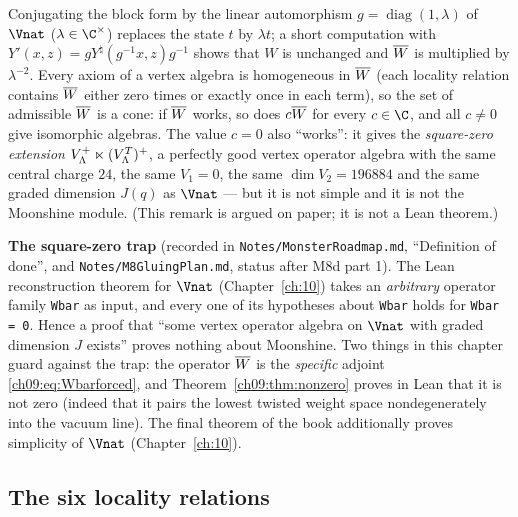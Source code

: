 \begin{remark}[Scaling, and why $\chnineWb=0$ is dangerous]\label{ch09:rem:scaling}
Conjugating the block form by the linear automorphism $g=\operatorname{diag}(1,\lambda)$ of
$\Vnat$ ($\lambda\in\C^\times$) replaces the state $t$ by $\lambda t$; a short computation with
$Y'(x,z)=gY^\natural(g^{-1}x,z)g^{-1}$ shows that $W$ is unchanged and $\overline{W}$ is multiplied
by $\lambda^{-2}$. Every axiom of a vertex algebra is homogeneous in $\overline{W}$ (each locality
relation contains $\overline{W}$ either zero times or exactly once in each term), so the set of
admissible $\overline{W}$ is a cone: if $\overline{W}$ works, so does $c\overline{W}$ for every
$c\in\C$, and all $c\neq0$ give isomorphic algebras. The value $c=0$ also ``works'': it gives the
\emph{square-zero extension} $V_{\Lambda}^{+}\ltimes(V_{\Lambda}^{T})^{+}$, a perfectly good vertex operator algebra
with the same central charge $24$, the same $V_1=0$, the same $\dim V_2=196884$ and the same
graded dimension $J(q)$ as $\Vnat$ --- but it is not simple and it is not the Moonshine module.
(This remark is argued on paper; it is not a Lean theorem.)
\end{remark}

\begin{warning}
\textbf{The square-zero trap} (recorded in \texttt{Notes/MonsterRoadmap.md}, ``Definition of
done'', and \texttt{Notes/M8GluingPlan.md}, status after M8d part 1). The Lean reconstruction
theorem for $\Vnat$ (Chapter~\ref{ch:10}) takes an \emph{arbitrary} operator family
\texttt{Wbar} as input, and every one of its hypotheses about \texttt{Wbar} holds for
\texttt{Wbar = 0}. Hence a proof that ``some vertex operator algebra on $\Vnat$ with graded
dimension $J$ exists'' proves nothing about Moonshine. Two things in this chapter guard against
the trap: the operator $\overline{W}$ is the \emph{specific} adjoint \eqref{ch09:eq:Wbarforced},
and Theorem~\ref{ch09:thm:nonzero} proves in Lean that it is not zero (indeed that it pairs
the lowest twisted weight space nondegenerately into the vacuum line). The final theorem of the
book additionally proves simplicity of $\Vnat$ (Chapter~\ref{ch:10}).
\end{warning}

\subsection{The six locality relations}

